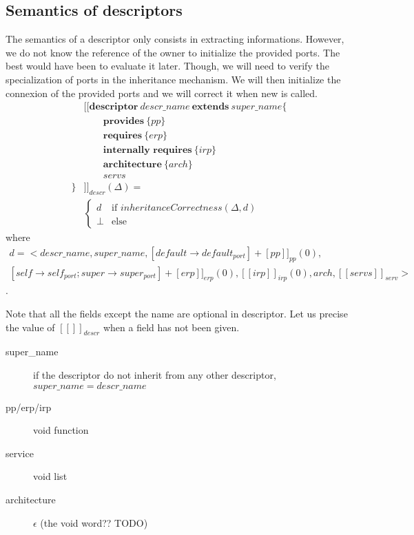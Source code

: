 \subsection{Semantics of descriptors}
The semantics of a descriptor only consists in extracting informations. However, we do not know the reference of the owner to initialize the provided ports. The best would have been to evaluate it later. Though, we will need to verify the specialization of ports in the inheritance mechanism. We will then initialize the connexion of the provided ports and we will correct it when \textsf{new} is called.
\begin{align*}
&[\![\textbf{descriptor} ~ descr\_name ~ \textbf{extends} ~ super\_name \{ \\
&\qquad\textbf{provides}~\{pp\} \\
&\qquad\textbf{requires}~\{erp\} \\
&\qquad\textbf{internally~requires}~\{irp\} \\
&\qquad\textbf{architecture}~\{arch\} \\
&\qquad servs\\
\} &]\!]_{descr}(\Delta)  = \\
&\begin{cases} d & \text{if $inheritanceCorrectness(\Delta,d)$}\\
\perp & \text{else}
\end{cases} 
\end{align*}
where \begin{multline*}d = <descr\_name,super\_name,[default \rightarrow default_{port}] + \![pp]\!]_{pp}(0), \\
[self \rightarrow self_{port}; super \rightarrow super_{port}]+ \![erp]\!]_{erp}(0),[\![irp]\!]_{irp}(0),arch,[\![servs]\!]_{serv}>\end{multline*}.

Note that all the fields except the name are optional in descriptor. Let us precise the value of $[\![]\!]_{descr}$ when a field has not been given.
\begin{description}
\item[super\_name] if the descriptor do not inherit from any other descriptor, $super\_name = descr\_name$
\item[pp/erp/irp] void function
\item[service] void list
\item[architecture] $\epsilon$ (the void word?? TODO)
\end{description}


